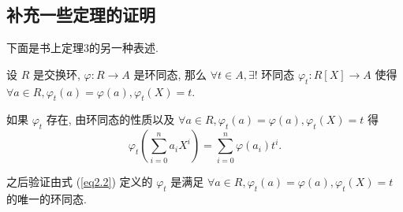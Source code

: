 \documentclass[color=black,device=normal,lang=cn,mode=geye]{elegantnote}
\begin{document}
\subsection{补充一些定理的证明}
下面是书上定理3的另一种表述.
\begin{theorem}[书上的定理3]\label{t2.1}
    设 $R$ 是交换环, $\varphi:R\to A$ 是环同态, 那么 $\forall t\in A,\exists!$ 环同态 $\varphi_t:R[X]\to A$ 使得 $\forall a\in R,\varphi_t(a)=\varphi(a),\varphi_t(X)=t$.
\end{theorem}
\begin{thought}
    如果 $\varphi_t$ 存在, 由环同态的性质以及 $\forall a\in R,\varphi_t(a)=\varphi(a),\varphi_t(X)=t$ 得
    \begin{equation}\label{eq2.2}
        \varphi_t\left(\sum\limits_{i=0}^{n}a_iX^i\right)=\sum\limits_{i=0}^{n}\varphi(a_i)t^i.
    \end{equation}

    之后验证由式 (\ref{eq2.2}) 定义的 $\varphi_t$ 是满足 $\forall a\in R,\varphi_t(a)=\varphi(a),\varphi_t(X)=t$ 的唯一的环同态.
\end{thought}
\end{document}
